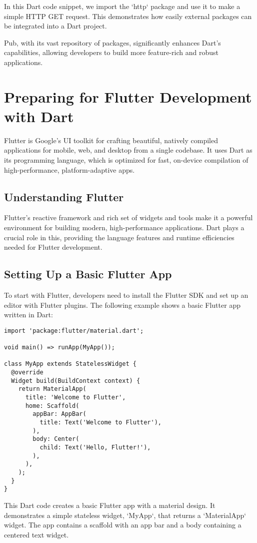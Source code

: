 \documentclass{book}
\begin{document}
In this Dart code snippet, we import the `http` package and use it to make a simple HTTP GET request. This demonstrates how easily external packages can be integrated into a Dart project.

Pub, with its vast repository of packages, significantly enhances Dart's capabilities, allowing developers to build more feature-rich and robust applications.


\chapter{Preparing for Flutter Development with Dart}

Flutter is Google's UI toolkit for crafting beautiful, natively compiled applications for mobile, web, and desktop from a single codebase. It uses Dart as its programming language, which is optimized for fast, on-device compilation of high-performance, platform-adaptive apps.

\section{Understanding Flutter}
Flutter's reactive framework and rich set of widgets and tools make it a powerful environment for building modern, high-performance applications. Dart plays a crucial role in this, providing the language features and runtime efficiencies needed for Flutter development.

\section{Setting Up a Basic Flutter App}
To start with Flutter, developers need to install the Flutter SDK and set up an editor with Flutter plugins. The following example shows a basic Flutter app written in Dart:

\begin{lstlisting}[style=dartstyle]
import 'package:flutter/material.dart';

void main() => runApp(MyApp());

class MyApp extends StatelessWidget {
  @override
  Widget build(BuildContext context) {
    return MaterialApp(
      title: 'Welcome to Flutter',
      home: Scaffold(
        appBar: AppBar(
          title: Text('Welcome to Flutter'),
        ),
        body: Center(
          child: Text('Hello, Flutter!'),
        ),
      ),
    );
  }
}
\end{lstlisting}

This Dart code creates a basic Flutter app with a material design. It demonstrates a simple stateless widget, `MyApp`, that returns a `MaterialApp` widget. The app contains a scaffold with an app bar and a body containing a centered text widget.
\end{document}
